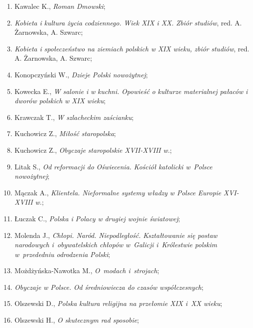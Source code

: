 \documentclass[a4paper,11pt]{article}
\begin{document}
\begin{enumerate}
\item Kawalec K., \textit{Roman Dmowski};

\item \textit{Kobieta i kultura życia codziennego. Wiek XIX i XX. Zbiór
    studiów}, red. A. Żarnowska, A. Szwarc;

\item \textit{Kobieta i społeczeństwo na ziemiach polskich w XIX wieku,
    zbiór studiów}, red. A. Żarnowska, A. Szwarc;

\item Konopczyński W., \textit{Dzieje Polski nowożytnej};

\item Kowecka E., \textit{W salonie i w kuchni. Opowieść o kulturze
    materialnej pałaców i dworów polskich w XIX wieku};

\item Krawczak T., \textit{W szlacheckim zaścianku};

\item Kuchowicz Z., \textit{Miłość staropolska};

\item Kuchowicz Z., \textit{Obyczaje staropolskie XVII-XVIII w.};

\item Litak S., \textit{Od reformacji do Oświecenia. Kościół katolicki
    w~Polsce nowożytnej};

\item Mączak A., \textit{Klientela. Nieformalne systemy władzy w Polsce
    Europie XVI-XVIII w.};

\item Łuczak C., \textit{Polska i Polacy w drugiej wojnie światowej};

\item Molenda J., \textit{Chłopi. Naród. Niepodległość. Kształtowanie
    się postaw narodowych i~obywatelskich chłopów w~Galicji
    i~Królestwie polskim w~przededniu odrodzenia Polski};

\item Możdżyńska-Nawotka M., \textit{O~modach i~strojach};

\item \textit{Obyczaje w Polsce. Od średniowiecza do czasów
    współczesnych};

\item Olszewski D., \textit{Polska kultura religijna na przełomie XIX
    i~XX wieku};

\item Olszewski H., \textit{O skutecznym rad sposobie};


\end{enumerate}
\end{document}
